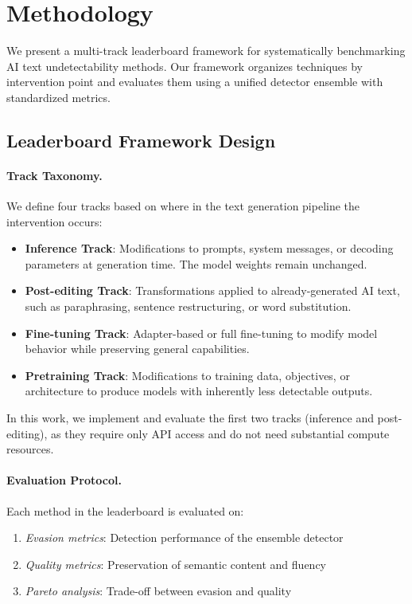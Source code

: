 \section{Methodology}
\label{sec:methodology}

We present a multi-track leaderboard framework for systematically benchmarking AI text undetectability methods. Our framework organizes techniques by intervention point and evaluates them using a unified detector ensemble with standardized metrics.

\subsection{Leaderboard Framework Design}

\paragraph{Track Taxonomy.} We define four tracks based on where in the text generation pipeline the intervention occurs:

\begin{itemize}
    \item \textbf{Inference Track}: Modifications to prompts, system messages, or decoding parameters at generation time. The model weights remain unchanged.
    \item \textbf{Post-editing Track}: Transformations applied to already-generated AI text, such as paraphrasing, sentence restructuring, or word substitution.
    \item \textbf{Fine-tuning Track}: Adapter-based or full fine-tuning to modify model behavior while preserving general capabilities.
    \item \textbf{Pretraining Track}: Modifications to training data, objectives, or architecture to produce models with inherently less detectable outputs.
\end{itemize}

In this work, we implement and evaluate the first two tracks (inference and post-editing), as they require only API access and do not need substantial compute resources.

\paragraph{Evaluation Protocol.} Each method in the leaderboard is evaluated on:
\begin{enumerate}
    \item \textit{Evasion metrics}: Detection performance of the ensemble detector
    \item \textit{Quality metrics}: Preservation of semantic content and fluency
    \item \textit{Pareto analysis}: Trade-off between evasion and quality
\end{enumerate}

